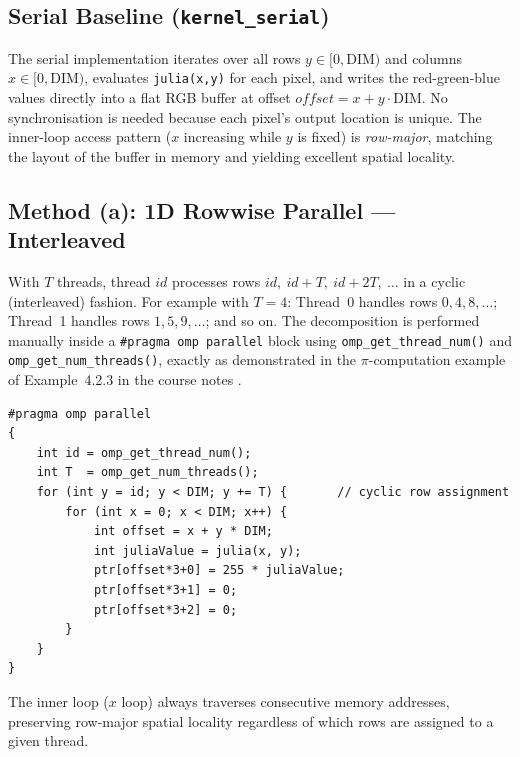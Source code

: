 \subsection{Serial Baseline (\texttt{kernel\_serial})}

The serial implementation iterates over all rows $y \in [0, \text{DIM})$ and columns
$x \in [0, \text{DIM})$, evaluates \texttt{julia(x,y)} for each pixel, and writes the
red-green-blue values directly into a flat RGB buffer at offset
$\textit{offset} = x + y \cdot \text{DIM}$.
No synchronisation is needed because each pixel's output location is unique.
The inner-loop access pattern ($x$ increasing while $y$ is fixed) is \emph{row-major},
matching the layout of the buffer in memory and yielding excellent spatial locality.

\subsection{Method (a): 1D Rowwise Parallel — Interleaved}

With $T$ threads, thread $\mathit{id}$ processes rows
$\mathit{id},\ \mathit{id}+T,\ \mathit{id}+2T,\ \ldots$
in a cyclic (interleaved) fashion.
For example with $T = 4$: Thread~0 handles rows $0, 4, 8, \ldots$; Thread~1 handles
rows $1, 5, 9, \ldots$; and so on.
The decomposition is performed manually inside a \texttt{\#pragma omp parallel} block
using \texttt{omp\_get\_thread\_num()} and \texttt{omp\_get\_num\_threads()},
exactly as demonstrated in the $\pi$-computation example of Example~4.2.3 in the
course notes \citep{trobec2018introduction}.

\begin{lstlisting}[caption={1D Rowwise interleaved kernel (key excerpt)},label={lst:rowwise}]
#pragma omp parallel
{
    int id = omp_get_thread_num();
    int T  = omp_get_num_threads();
    for (int y = id; y < DIM; y += T) {       // cyclic row assignment
        for (int x = 0; x < DIM; x++) {
            int offset = x + y * DIM;
            int juliaValue = julia(x, y);
            ptr[offset*3+0] = 255 * juliaValue;
            ptr[offset*3+1] = 0;
            ptr[offset*3+2] = 0;
        }
    }
}
\end{lstlisting}

The inner loop ($x$ loop) always traverses consecutive memory addresses, preserving
row-major spatial locality regardless of which rows are assigned to a given thread.


